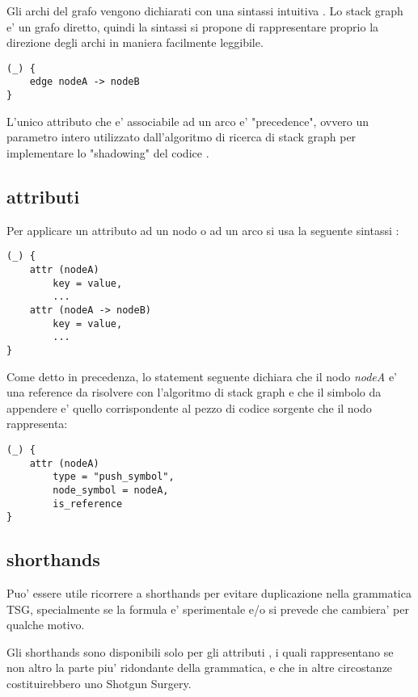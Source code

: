 Gli archi del grafo vengono dichiarati con una sintassi intuitiva \cite{TreeSitterGraphReferenceEdges}.
Lo stack graph e' un grafo diretto, quindi la sintassi si propone di rappresentare proprio la direzione degli archi in maniera facilmente leggibile.

\begin{lstlisting}
(_) {
    edge nodeA -> nodeB
}
\end{lstlisting}

L'unico attributo che e' associabile ad un arco e' "precedence", ovvero un parametro intero utilizzato dall'algoritmo di ricerca di stack graph per implementare lo "shadowing" del codice \cite{TreeSitterStackGraphEdges}.

\subsection{attributi}

Per applicare un attributo ad un nodo o ad un arco si usa la seguente sintassi \cite{TreeSitterGraphReferenceAttributes}:

\begin{lstlisting}
(_) {
    attr (nodeA)
        key = value,
        ...
    attr (nodeA -> nodeB)
        key = value,
        ...
}
\end{lstlisting}

Come detto in precedenza, lo statement seguente dichiara che il nodo \emph{nodeA} e' una reference da risolvere con l'algoritmo di stack graph e che il simbolo da appendere e' quello corrispondente al pezzo di codice sorgente che il nodo rappresenta:

\begin{lstlisting}
(_) {
    attr (nodeA)
        type = "push_symbol",
        node_symbol = nodeA,
        is_reference
}
\end{lstlisting}

\subsection{shorthands}
Puo' essere utile ricorrere a shorthands per evitare duplicazione nella grammatica TSG, specialmente se la formula e' sperimentale e/o si prevede che cambiera' per qualche motivo.

Gli shorthands sono disponibili solo per gli attributi \cite{TreeSitterGraphReferenceAttributeShorthands}, i quali rappresentano se non altro la parte piu' ridondante della grammatica, e che in altre circostanze costituirebbero uno Shotgun Surgery.

